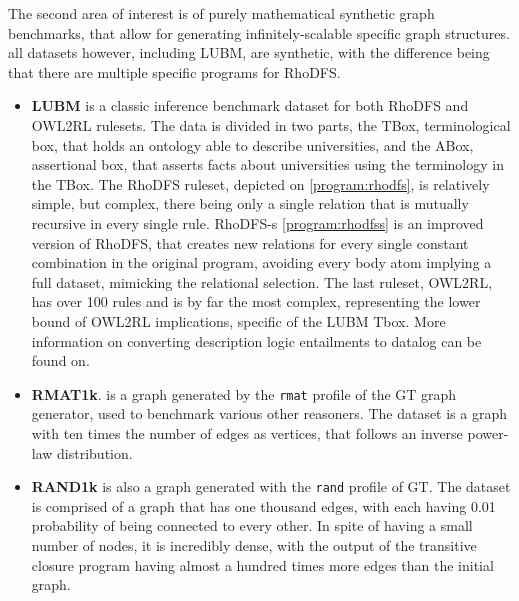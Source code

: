 \documentclass[sigconf,screen,review=false,natbib]{acmart}
\theoremstyle{definition}
\begin{document}
The second area of interest is of purely mathematical synthetic graph benchmarks, that allow for generating infinitely-scalable specific graph structures. all datasets however,
including LUBM\cite{lubm}, are synthetic, with the difference being that there are multiple specific programs for RhoDFS.
\begin{itemize}
	\item \textbf{LUBM} is a classic inference benchmark dataset for both RhoDFS and OWL2RL rulesets. The data is divided in two parts, the TBox, terminological box, that holds
	      an ontology able to describe universities, and the ABox, assertional box, that asserts facts about universities using the terminology in the TBox. The RhoDFS ruleset, depicted
	      on \ref{program:rhodfs}, is relatively simple, but complex, there being only a single relation that is mutually recursive in every single rule. RhoDFS-s \ref{program:rhodfss} is
	      an improved version of RhoDFS, that creates new relations for every single constant combination in the original program, avoiding every body atom implying a full dataset, mimicking
	      the relational selection. The last ruleset, OWL2RL, has over 100 rules and is by far the most complex, representing the lower bound of OWL2RL implications, specific of the LUBM
	      Tbox. More information on converting description logic entailments to datalog can be found on\cite{descr_to_dlog}.
	\item \textbf{RMAT1k}. is a graph generated by the \verb|rmat| profile of the GT\cite{gtgraph} graph generator, used to benchmark various other reasoners\cite{recstep}\cite{bigdatalog}.
	      The dataset is a graph with ten times the number of edges as vertices, that follows an inverse power-law distribution.
	\item \textbf{RAND1k} is also a graph generated with the \verb|rand| profile of GT. The dataset is comprised of a graph that has one thousand edges, with each
	      having 0.01 probability of being connected to every other. In spite of having a small number of nodes, it is incredibly dense, with the output of the transitive closure program having almost
	      a hundred times more edges than the initial graph.
\end{itemize}
\end{document}
